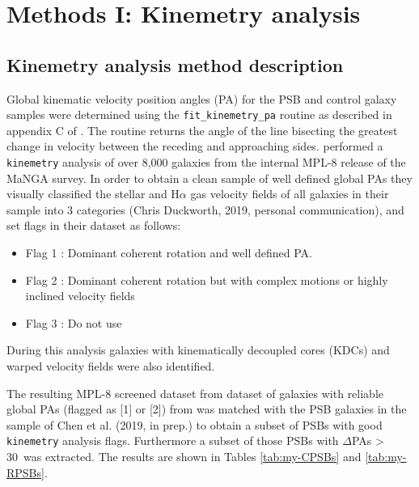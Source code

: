 \section{Methods I: Kinemetry analysis}
\label{sec:methods-I-kinemetry}

\subsection{Kinemetry analysis method description}
\label{kinemetry-analysis-method-description}
Global kinematic velocity position angles (PA) for the PSB and control galaxy samples were determined using the \texttt{fit\_kinemetry\_pa} routine as described in appendix C of \cite{2006MNRAS.366..787K}. The routine returns the angle of the line bisecting the greatest change in velocity between the receding and approaching sides. \cite{2019MNRAS.483..172D} performed a \texttt{kinemetry} analysis of over 8,000 galaxies from the internal MPL-8 release of the MaNGA survey. In order to obtain a clean sample of well defined global PAs they visually classified the stellar and H$\alpha$ gas velocity fields of all galaxies in their sample into 3 categories (Chris Duckworth, 2019, personal communication), and set flags in their dataset as follows:

\begin{itemize}
    \item {Flag 1} : Dominant coherent rotation and well defined PA. 
    \item {Flag 2} : Dominant coherent rotation but with complex motions or highly inclined velocity fields 
    \item {Flag 3} : Do not use
\end{itemize}

During this analysis galaxies with kinematically decoupled cores (KDCs) and warped velocity fields were also identified.

The resulting MPL-8 screened dataset from dataset of galaxies with reliable global PAs (flagged as [1] or [2]) from \cite{2019MNRAS.483..172D} was matched with the PSB galaxies in the sample of Chen et al. (2019, in prep.) to obtain a subset of PSBs with good \texttt{kinemetry} analysis flags. Furthermore a subset of those PSBs with $\Delta$PAs > 30\textdegree\ was extracted. The results are shown in Tables \ref{tab:my-CPSBs} and \ref{tab:my-RPSBs}. 

